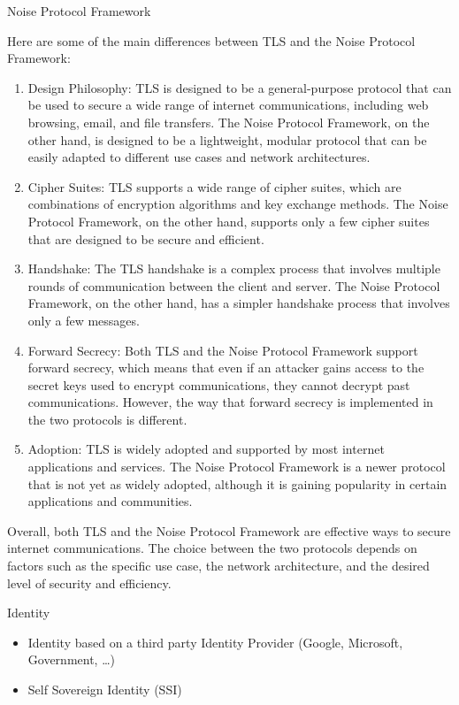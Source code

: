 \begin{block}{Noise Protocol Framework}
\begin{description}
Here are some of the main differences between TLS and the Noise Protocol Framework:

\begin{enumerate}
\tightlist
\item
  Design Philosophy: TLS is designed to be a general-purpose protocol that can be used to secure a wide range of internet communications, including web browsing, email, and file transfers. The Noise Protocol Framework, on the other hand, is designed to be a lightweight, modular protocol that can be easily adapted to different use cases and network architectures.
\item
  Cipher Suites: TLS supports a wide range of cipher suites, which are combinations of encryption algorithms and key exchange methods. The Noise Protocol Framework, on the other hand, supports only a few cipher suites that are designed to be secure and efficient.
\item
  Handshake: The TLS handshake is a complex process that involves multiple rounds of communication between the client and server. The Noise Protocol Framework, on the other hand, has a simpler handshake process that involves only a few messages.
\item
  Forward Secrecy: Both TLS and the Noise Protocol Framework support forward secrecy, which means that even if an attacker gains access to the secret keys used to encrypt communications, they cannot decrypt past communications. However, the way that forward secrecy is implemented in the two protocols is different.
\item
  Adoption: TLS is widely adopted and supported by most internet applications and services. The Noise Protocol Framework is a newer protocol that is not yet as widely adopted, although it is gaining popularity in certain applications and communities.
\end{enumerate}

Overall, both TLS and the Noise Protocol Framework are effective ways to secure internet communications. The choice between the two protocols depends on factors such as the specific use case, the network architecture, and the desired level of security and efficiency.
\end{description}
\end{block}

\label{notes__02025-identity.md}
\begin{block}{Identity}
\label{notes__02025-identity.md__identity}
\begin{itemize}
\tightlist
\item
  Identity based on a third party Identity Provider (Google, Microsoft, Government, \ldots)
\item
  Self Sovereign Identity (SSI)
\end{itemize}
\end{block}

